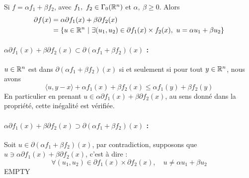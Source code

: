 \documentclass[a4paper,12pt]{article}
\begin{document}
\begin{propriete}
Si $f = \alpha f_1+\beta f_2$, avec $f_1,\ f_2\in\Gamma_0(\mathbb{R}^n)$ et $\alpha,\ \beta \geq 0$. Alors 
\begin{align*}
\partial f(x) &= \alpha \partial f_1(x) + \beta \partial f_2(x) \\
&= \left\{u\in\mathbb{R}^n\ |\ \exists (u_1,u_2)\in \partial f_1(x)\times f_2(x),\ u = \alpha u_1 + \beta u_2 \right\}
\end{align*}
\end{propriete}
\begin{preuve}
\vspace{-1cm}
\paragraph{$\alpha\partial f_1(x) +\beta \partial f_2(x) \subset
\partial (\alpha f_1 +\beta f_2)(x)$ :}$u\in\mathbb{R}^n$ est dans $\partial (\alpha f_1 +\beta f_2)(x)$ si et seulement si pour tout $y\in \mathbb{R}^n$, nous avons 
$$
\langle u,y-x\rangle + \alpha f_1(x) +\beta f_2(x) \leq  \alpha f_1(y) +\beta f_2(y) 
$$
En particulier en prenant $u\in \alpha\partial f_1(x) +\beta \partial f_2(x) $, au sens donné dans la propriété, cette inégalité est vérifiée. 

\paragraph{$\alpha\partial f_1(x) +\beta \partial f_2(x) \supset
\partial (\alpha f_1 +\beta f_2)(x)$ :}Soit $u\in\partial (\alpha f_1 +\beta f_2)(x)$, par contradiction, supposons que  $u\ni \alpha\partial f_1(x) +\beta \partial f_2(x)$, c'est à dire : 
$$
\forall (u_1,u_2)\in \partial f_1(x) \times \partial f_2(x),\quad u\neq \alpha u_1+\beta u_2
$$
{\Huge EMPTY}
\end{preuve}
\end{document}
